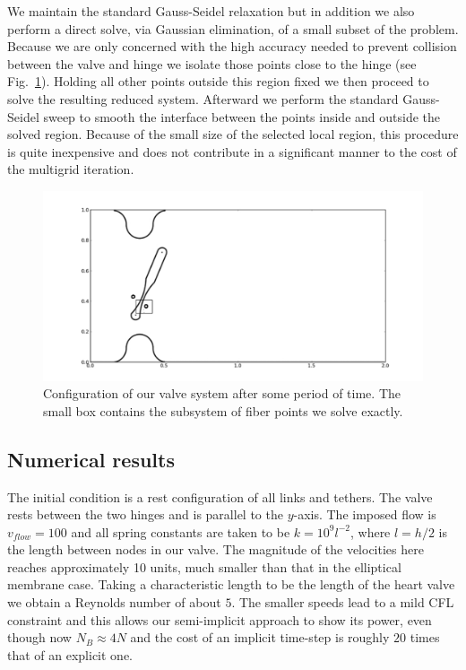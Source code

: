 \documentclass[preprint,12pt]{elsarticle}
\begin{document}
We maintain the standard Gauss-Seidel relaxation but in addition we also perform a direct solve, via Gaussian elimination,  of a small subset of the problem. Because we are only concerned with the high accuracy needed to prevent collision between the valve and hinge we isolate those points close to the hinge (see Fig.~\ref{fig:Box}). Holding all other points outside this region fixed we then proceed to solve the resulting reduced system. Afterward we perform the standard Gauss-Seidel sweep to smooth the interface between the points inside and outside the solved region. Because of the small size of the selected local region, 
 this procedure is quite inexpensive and does not contribute in a significant manner to the cost of the multigrid iteration.

\begin{figure}[!b]
  \begin{center}
    \includegraphics[bb=.5in .25in 7.35in 3.75in,width=5.25in,clip]{Box.pdf}
  \end{center}

  \caption{\small Configuration of our valve system after some period of time. The small box contains the subsystem of fiber points we solve exactly.}
  \label{fig:Box}
\end{figure}


\subsection{Numerical results}
The initial condition is a rest configuration of all links and tethers. The valve rests between the two hinges and is parallel to the $y$-axis. The imposed flow is $v_{flow}=100$ and all spring constants are taken to be $k=10^9l^{-2}$, where $l=h/2$ is the length between nodes in our valve. The magnitude of the velocities here reaches approximately 10 units,  much smaller than that in the elliptical membrane case. Taking a characteristic length to be the length of the heart valve we obtain a Reynolds number of about $5$. The smaller speeds lead to a mild CFL constraint and this allows our  semi-implicit approach to show its power, even though now $N_B \approx 4N$ and the cost of an implicit time-step is roughly $20$ times that of an explicit one.
\end{document}
